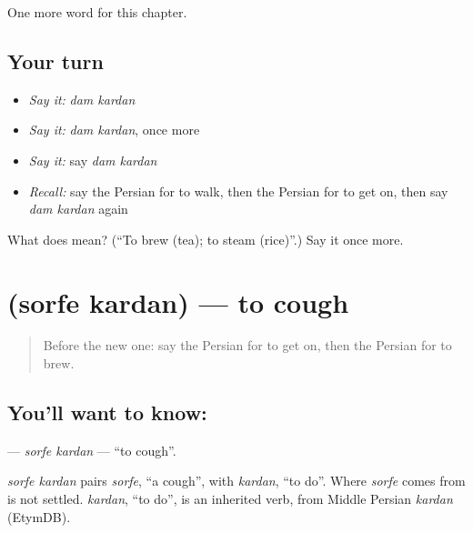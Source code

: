 \begin{grammarlens}[title={What you've built}]
One more word for this chapter.
\end{grammarlens}

\subsection*{Your turn}
\begin{itemize}
\raggedright
  \item \emph{Say it:} \emph{dam kardan}
  \item \emph{Say it:} \emph{dam kardan}, once more
  \item \emph{Say it:} say \emph{dam kardan}
  \item \emph{Recall:} say the Persian for to walk, then the Persian for to get on, then say \emph{dam kardan} again
\end{itemize}

\begin{tcolorbox}[breakable,colback=teal!4,colframe=teal!35!black,title={Before you move on}]
What does   mean? (\textquotedblleft{}To brew (tea); to steam (rice)\textquotedblright{}.) Say it once more.
\end{tcolorbox}
\section[\texorpdfstring{\fa{سرفه} \fa{کردن} (sorfe kardan)}{سرفه کردن (sorfe kardan)}]{  (sorfe kardan) — to cough}

\label{lesson:FA-C218-sorfe-kardan}



\begin{quote}
Before the new one: say the Persian for to get on, then the Persian for to brew.
\end{quote}

\subsection*{You'll want to know:  }
\textbf{ } — \emph{sorfe kardan} — \textquotedblleft{}to cough\textquotedblright{}.

\begin{cousinweb}
\emph{sorfe kardan} pairs \emph{sorfe}, \textquotedblleft{}a cough\textquotedblright{}, with \emph{kardan}, \textquotedblleft{}to do\textquotedblright{}. Where \emph{sorfe} comes from is not settled. \emph{kardan}, \textquotedblleft{}to do\textquotedblright{}, is an inherited verb, from Middle Persian \emph{kardan} (EtymDB).
\end{cousinweb}

